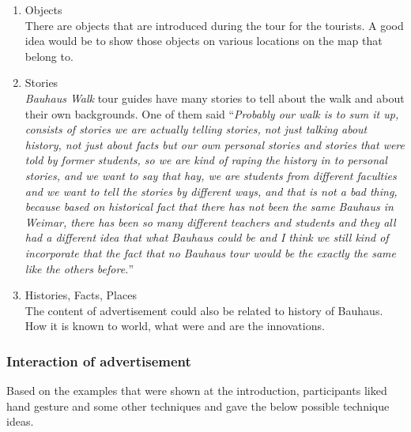 \begin {enumerate}

\item   Objects \\
There are objects that are introduced during the tour for the tourists. A good idea would be to show those objects on various locations on the map that belong to.
\item   Stories \\
\emph{Bauhaus Walk} tour guides have many stories to tell about the walk and about their own backgrounds. One of them said ``\emph{Probably our walk is to sum it up, consists of stories we are actually telling stories, not just talking about history, not just about facts but our own personal stories and stories that were told by former students, so we are kind of raping the history in to personal stories, and we want to say that hay, we are students from different faculties and we want to tell the stories by different ways, and that is not a bad thing, because based on historical fact that there has not been the same Bauhaus in Weimar, there has been so many different teachers and students and they all had a different idea that what Bauhaus could be and I think we still kind of incorporate that the fact that no Bauhaus tour would be the exactly the same like the others before.}''
\item   Histories, Facts, Places \\
The content of advertisement could also be related to history of Bauhaus. How it is known to world, what were and are the innovations.


\end{enumerate}

\subsubsection{Interaction of advertisement}
Based on the examples that were shown at the introduction, participants liked hand gesture and some other techniques and gave the below possible technique ideas.

